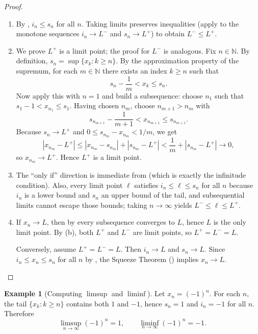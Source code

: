 \documentclass[12pt]{article}
\numberwithin{equation}{section}
\def\abs#1{|#1|}
\newcommand{\NN}{\mathbb{N}}
\DeclarePairedDelimiter{\abs}{\lvert}{\rvert}
\theoremstyle{plain}
\theoremstyle{definition}
\newtheorem{example}[theorem]{Example}
\theoremstyle{remark}
\begin{document}
\begin{proof}
\begin{enumerate}[label=(\alph*)]
\item By , $i_n\le s_n$ for all $n$.
Taking limits preserves inequalities (apply  to the monotone sequences $i_n\to L^-$ and $s_n\to L^+$) to obtain $L^-\le L^+$.

\item We prove $L^+$ is a limit point; the proof for $L^-$ is analogous.
Fix $n\in\NN$. By definition, $s_n=\sup\{x_k:k\ge n\}$.
By the approximation property of the supremum, for each $m\in\NN$ there exists an index $k\ge n$ such that
\[
s_n-\frac{1}{m} < x_k \le s_n.
\]
Now apply this with $n=1$ and build a subsequence: choose $n_1$ such that $s_1-1 < x_{n_1}\le s_1$.
Having chosen $n_m$, choose $n_{m+1}>n_m$ with
\[
s_{n_{m+1}}-\frac{1}{m+1} < x_{n_{m+1}} \le s_{n_{m+1}}.
\]
Because $s_n\to L^+$ and $0\le s_{n_{m}}-x_{n_m}<1/m$, we get
\[
\abs{x_{n_m}-L^+}\le \abs{x_{n_m}-s_{n_m}}+\abs{s_{n_m}-L^+}<\frac{1}{m}+\abs{s_{n_m}-L^+}\to 0,
\]
so $x_{n_m}\to L^+$. Hence $L^+$ is a limit point.

\item The “only if” direction is immediate from  (which is exactly the infinitude condition).
Also, every limit point $\ell$ satisfies $i_n\le \ell \le s_n$ for all $n$ because $i_n$ is a lower bound and $s_n$ an upper bound of the tail, and subsequential limits cannot escape those bounds; taking $n\to\infty$ yields $L^-\le \ell \le L^+$.

\item If $x_n\to L$, then by  every subsequence converges to $L$, hence $L$ is the only limit point.
By (b), both $L^+$ and $L^-$ are limit points, so $L^+=L^-=L$.

Conversely, assume $L^+=L^-=L$.
Then $i_n\to L$ and $s_n\to L$. Since $i_n\le x_n\le s_n$ for all $n$ by , the Squeeze Theorem () implies $x_n\to L$.
\end{enumerate}
\end{proof}

\begin{example}[Computing $\limsup$ and $\liminf$]
Let $x_n=(-1)^n$.
For each $n$, the tail $\{x_k:k\ge n\}$ contains both $1$ and $-1$, hence $s_n=1$ and $i_n=-1$ for all $n$.
Therefore
\[
\limsup_{n\to\infty} (-1)^n = 1,
\qquad
\liminf_{n\to\infty} (-1)^n = -1.
\]
\end{example}
\end{document}
